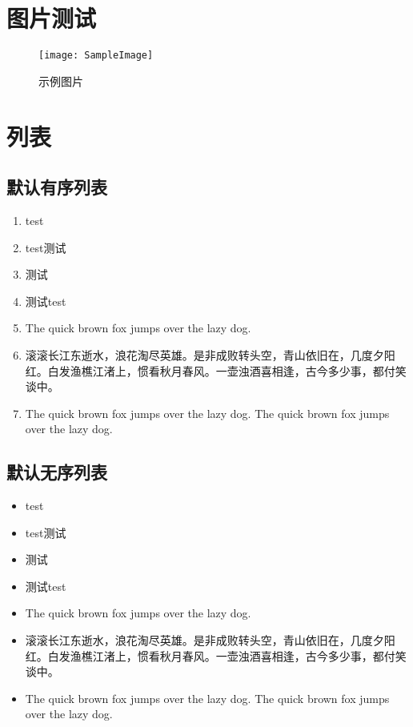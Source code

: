 \documentclass{../../PublicResources/DocClassLight}
\begin{document}
    \section{图片测试}
    \begin{figure}[h]
        \centering
        \texttt{[image: SampleImage]}
        \caption{示例图片}
    \end{figure}

    \section{列表}
    \subsection{默认有序列表}
    \begin{enumerate}
        \item test
        \item test测试
        \item 测试
        \item 测试test
        \item The quick brown fox jumps over the lazy dog.
        \item 滚滚长江东逝水，浪花淘尽英雄。是非成败转头空，青山依旧在，几度夕阳红。白发渔樵江渚上，惯看秋月春风。一壶浊酒喜相逢，古今多少事，都付笑谈中。
        \item The quick brown fox jumps over the lazy dog. The quick brown fox jumps over the lazy dog.
    \end{enumerate}

    \subsection{默认无序列表}
    \begin{itemize}
        \item test
        \item test测试
        \item 测试
        \item 测试test
        \item The quick brown fox jumps over the lazy dog.
        \item 滚滚长江东逝水，浪花淘尽英雄。是非成败转头空，青山依旧在，几度夕阳红。白发渔樵江渚上，惯看秋月春风。一壶浊酒喜相逢，古今多少事，都付笑谈中。
        \item The quick brown fox jumps over the lazy dog. The quick brown fox jumps over the lazy dog.
    \end{itemize}
\end{document}
